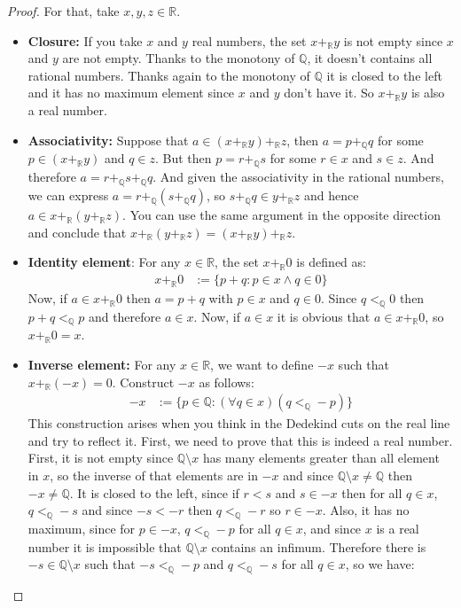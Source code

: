 \documentclass{tufte-handout}
\begin{document}
\begin{proof}
	For that, take $x, y, z \in \mathbb{R}$. 
	\begin{itemize}
		\item \textbf{Closure:} If you take $x$ and $y$ real numbers, the set $x +_\mathbb{R} y$ is not empty since $x$ and $y$ are not empty. Thanks to the monotony of $\mathbb{Q}$, it doesn't contains all rational numbers. Thanks again to the monotony of $\mathbb{Q}$ it is closed to the left and it has no maximum element since $x$ and $y$ don't have it. So $x +_\mathbb{R} y$ is also a real number.
		\item \textbf{Associativity:} Suppose that $a \in (x +_\mathbb{R} y) +_\mathbb{R} z$, then $a = p +_\mathbb{Q} q$ for some $p \in (x +_\mathbb{R} y)$ and $q \in z$. But then $p = r +_\mathbb{Q} s$ for some $r \in x$ and $s \in z$. And therefore $a =r +_\mathbb{Q} s +_\mathbb{Q} q$. And given the associativity in the rational numbers, we can express $a = r +_\mathbb{Q} (s +_\mathbb{Q} q)$, so $s +_\mathbb{Q} q \in y+_\mathbb{R} z$ and hence $a \in x +_\mathbb{R} (y +_\mathbb{R} z)$. You can use the same argument in the opposite direction and conclude that $x +_\mathbb{R} (y +_\mathbb{R} z) = (x +_\mathbb{R} y) +_\mathbb{R} z$.
		\item \textbf{Identity element}: For any $x \in \mathbb{R}$, the set $x +_\mathbb{R} 0$ is defined as:
		\begin{align*}
			x +_\mathbb{R} 0 &:= \{p + q: p \in x \wedge q \in 0\}
		\end{align*}
		Now, if $a \in x+_\mathbb{R} 0$ then $a = p + q$ with $p \in x$ and $q \in 0$. Since $q <_\mathbb{Q} 0$ then $p + q <_\mathbb{Q} p$ and therefore $a \in x$. Now, if $a \in x$ it is obvious that $a \in x+_\mathbb{R} 0$, so $x +_\mathbb{R} 0 = x$.
		\item \textbf{Inverse element:} For any $x \in \mathbb{R}$, we want to define $-x$ such that $x +_\mathbb{R} (-x) = 0$. Construct $-x$ as follows:
		\begin{align*}
			-x &:= \{p \in \mathbb{Q}: (\forall q \in x)(q <_\mathbb{Q} -p)\}
		\end{align*}
		This construction arises when you think in the Dedekind cuts on the real line and try to reflect it. First, we need to prove that this is indeed a real number. First, it is not empty since $\mathbb{Q} \setminus x$ has many elements greater than all element in $x$, so the inverse of that elements are in $-x$ and since $\mathbb{Q} \setminus x \neq \mathbb{Q}$ then $-x \neq \mathbb{Q}$. It is closed to the left, since if $r < s$ and $s \in -x$ then for all $q \in x$, $q <_\mathbb{Q} -s$ and since $-s < -r$ then $q <_\mathbb{Q} -r$ so $r \in -x$. Also, it has no maximum, since for $p \in -x$, $q <_\mathbb{Q} -p$ for all $q \in x$, and since $x$ is a real number it is impossible that $\mathbb{Q} \setminus x$ contains an infimum. Therefore there is $-s \in \mathbb{Q} \setminus x$ such that $-s <_\mathbb{Q} -p$ and $q <_\mathbb{Q} -s$ for all $q \in x$, so we have:

\end{itemize}
\end{proof}
\end{document}
